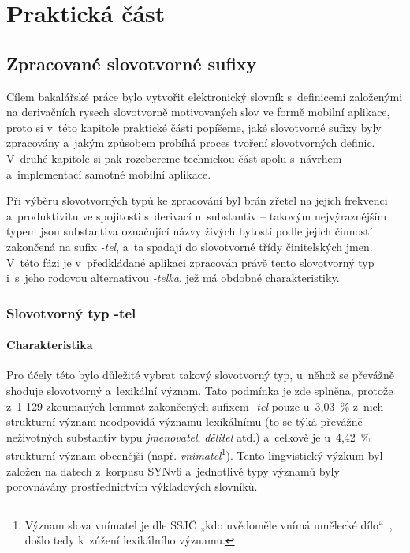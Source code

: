 \part{Praktická část}

\hypertarget{zpracovanuxe9-slovotvornuxe9-sufixy}{%
\chapter{Zpracované slovotvorné
sufixy}\label{zpracovanuxe9-slovotvornuxe9-sufixy}}

Cílem bakalářské práce bylo vytvořit elektronický slovník s~definicemi
založenými na derivačních rysech slovotvorně motivovaných slov ve formě
mobilní aplikace, proto si v~této kapitole praktické části popíšeme,
jaké slovotvorné sufixy byly zpracovány a~jakým způsobem probíhá proces
tvoření slovotvorných definic. V~druhé kapitole si pak rozebereme
technickou část spolu s~návrhem a~implementací samotné mobilní aplikace.

Při výběru slovotvorných typů ke zpracování byl brán zřetel na jejich
frekvenci a~produktivitu ve spojitosti s~derivací u~substantiv --
takovým nejvýraznějším typem jsou substantiva označující názvy živých
bytostí podle jejich činností zakončená na sufix \emph{-tel}, a~ta
spadají do slovotvorné třídy činitelských jmen.
\parencite[17]{dokulil67} V~této fázi je v~předkládané aplikaci
zpracován právě tento slovotvorný typ i~s~jeho rodovou alternativou
\emph{-telka}, jež má obdobné charakteristiky.

\hypertarget{slovotvornuxfd-typ--tel}{%
\section{Slovotvorný typ -tel}\label{slovotvornuxfd-typ--tel}}

\hypertarget{charakteristika}{%
\subsection{Charakteristika}\label{charakteristika}}

Pro účely této bylo důležité vybrat takový slovotvorný typ, u~něhož se
převážně shoduje slovotvorný a~lexikální význam. Tato podmínka je zde
splněna, protože z~1 129 zkoumaných lemmat zakončených sufixem
\emph{-tel} pouze u~3,03~\% z~nich strukturní význam neodpovídá významu
lexikálnímu (to se týká převážně neživotných substantiv typu
\emph{jmenovatel}, \emph{dělitel} atd.) a~celkově je u~4,42~\%
strukturní význam obecnější (např.
\emph{vnímatel}\footnote{Význam slova vnímatel je dle SSJČ „kdo uvědoměle vnímá umělecké dílo“~\parencite{ssjc}, došlo tedy k~zúžení lexikálního významu.}).
Tento lingvistický výzkum byl založen na datech z~korpusu SYNv6
a~jednotlivé typy významů byly porovnávány prostřednictvím výkladových
slovníků.~\parencite{adri}

